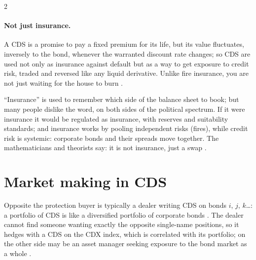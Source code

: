 \begin{paracol}{2}
\paragraph{Not just insurance.} A CDS is a promise to pay a fixed premium for its life, but its value fluctuates, inversely to the bond, whenever the warranted
discount rate changes; so CDS are used not only as insurance against default but as a way to get exposure to credit risk, traded and reversed like any liquid
derivative. Unlike fire insurance, you are not just waiting for the house to burn .

\begin{intuition}
``Insurance'' is used to remember which side of the balance sheet to book; but many people dislike the word, on both sides of the political spectrum. If it were
insurance it would be regulated as insurance, with reserves and suitability standards; and insurance works by pooling independent risks (fires), while credit risk
is systemic: corporate bonds and their spreads move together. The mathematicians and theorists say: it is not insurance, just a swap
.
\end{intuition}

\section{Market making in CDS}\label{sec:cds-dealers}

Opposite the protection buyer is typically a dealer writing CDS on bonds $i$, $j$, $k$\ldots: a portfolio of CDS is like a diversified portfolio of corporate bonds
. The dealer cannot find someone wanting exactly the opposite single-name positions, so it hedges with a CDS on the
CDX index, which is correlated with its portfolio; on the other side may be an asset manager seeking exposure to the bond market as a whole
.

\begin{nfigure}
\begin{taccts}
\quad
{}\quad
{}
\end{taccts}
\caption{A CDS dealer hedging a portfolio of single names with the index .}\label{fig:cds-dealer}
\end{nfigure}


\end{paracol}
